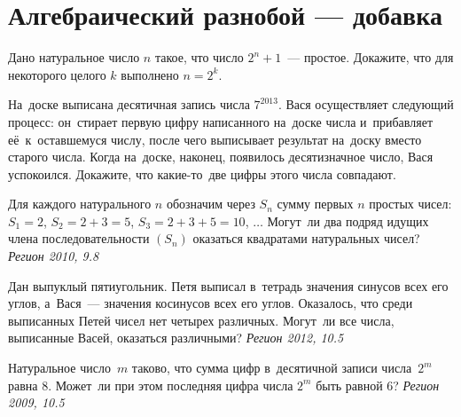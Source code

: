 
\section*{Алгебраический разнобой --- добавка}





\begin{problems}

\item
Дано натуральное число $n$ такое, что число $2^n + 1$~--- простое.
Докажите, что для некоторого целого $k$ выполнено $n = 2^k$.

\item
На~доске выписана десятичная запись числа $7^{2013}$.
Вася осуществляет следующий процесс: он~стирает первую цифру написанного
на~доске числа и~прибавляет её~к~оставшемуся числу, после чего выписывает
результат на~доску вместо старого числа.
Когда на~доске, наконец, появилось десятизначное число, Вася успокоился.
Докажите, что какие-то~две цифры этого числа совпадают.

\item
Для каждого натурального $n$ обозначим через $S_n$ сумму первых $n$ простых
чисел: $S_1 = 2$, $S_2 = 2+3 = 5$, $S_3 = 2 + 3 + 5 = 10$, $\ldots$
Могут~ли два подряд идущих члена последовательности $(S_n)$ оказаться
квадратами натуральных чисел?
\emph{\small Регион 2010, 9.8}

\item
Дан выпуклый пятиугольник.
Петя выписал в~тетрадь значения синусов всех его углов, а~Вася~--- значения
косинусов всех его углов.
Оказалось, что среди выписанных Петей чисел нет четырех различных.
Могут~ли все числа, выписанные Васей, оказаться различными?
\emph{\small Регион 2012, 10.5}

\item
Натуральное число~$m$ таково, что сумма цифр в~десятичной записи числа~$2^m$
равна 8.
Может~ли при этом последняя цифра числа $2^m$ быть равной 6?
\emph{\small Регион 2009, 10.5}

\end{problems}

